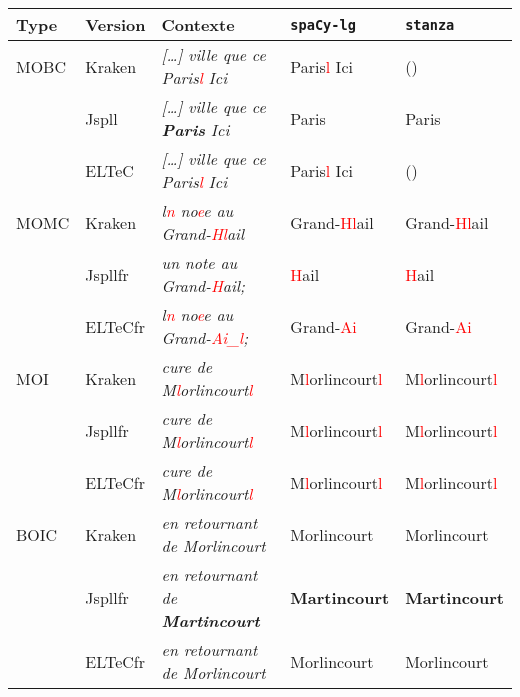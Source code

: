 \begin{tabular}{|l|l|l|l|l|}
\hline
Type &Version & Contexte & \texttt{spaCy-lg} &\texttt{stanza}\\
\hline
MOBC &Kraken &\textit{[…] ville que ce Paris\textcolor{red}{l} Ici}& Paris\textcolor{red}{l} Ici & () \\
&Jspll&\textit{[…] ville que ce \textbf{Paris} Ici}& Paris &Paris \\
&ELTeC&\textit{[…] ville que ce Paris\textcolor{red}{l} Ici} & Paris\textcolor{red}{l} Ici &() \\
\hline
MOMC& Kraken&\textit{l\textcolor{red}{n} no\textcolor{red}{e}e au Grand-\textcolor{red}{Hl}ail} &Grand-\textcolor{red}{Hl}ail &Grand-\textcolor{red}{Hl}ail \\
&Jspllfr&\textit{un note au Grand-\textcolor{red}{H}ail;} & \textcolor{red}{H}ail&\textcolor{red}{H}ail \\
&ELTeCfr& \textit{l\textcolor{red}{n} no\textcolor{red}{e}e au Grand-\textcolor{red}{Ai\_l};} & Grand-\textcolor{red}{Ai }&Grand-\textcolor{red}{Ai } \\
\hline
MOI&Kraken& \textit{cure de M\textcolor{red}{l}orlincourt\textcolor{red}{l}}& M\textcolor{red}{l}orlincourt\textcolor{red}{l} & M\textcolor{red}{l}orlincourt\textcolor{red}{l}\\
&Jspllfr&\textit{cure de  M\textcolor{red}{l}orlincourt\textcolor{red}{l}} &   M\textcolor{red}{l}orlincourt\textcolor{red}{l}& M\textcolor{red}{l}orlincourt\textcolor{red}{l}\\
&ELTeCfr& \textit{cure de  M\textcolor{red}{l}orlincourt\textcolor{red}{l}}&  M\textcolor{red}{l}orlincourt\textcolor{red}{l}&  M\textcolor{red}{l}orlincourt\textcolor{red}{l} \\
\hline
BOIC&Kraken& \textit{en retournant
de Morlincourt} &Morlincourt &Morlincourt \\
&Jspllfr&\textit{en retournant
de\textbf{ Martincourt}} & \textbf{Martincourt} & \textbf{Martincourt} \\
&ELTeCfr&\textit{en retournant
de Morlincourt} &Morlincourt &Morlincourt \\
\hline
\end{tabular}



